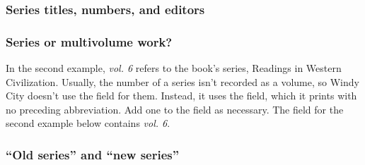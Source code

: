 \documentclass[11pt,letterpaper,oneside]{article}
\begin{document}

\begin{citebib}
\item \cite{barrows1959}
\item \cite*{donne1995}
\newrefcontext[sorting=reverse]
\end{citebib}
\newrefcontext[sorting=nty]

\subsubsection{Series titles, numbers, and editors}
\label{14.123}

\begin{citebib}
\item \cite{lei2014}
\item \cite{mazrim2011}
\item \cite{wauchope1950}
\item \cite{allen2009}
\end{citebib}

\subsubsection{Series or multivolume work?}

In the second example, \textit{vol. 6} refers to the book's series,
Readings in Western Civilization. Usually, the number of a series
isn't recorded as a volume, so Windy City doesn't use the
 field for them. Instead, it uses the
 field, which it prints with no preceding
abbreviation. Add one to the field as necessary. The 
field for the second example below contains \textit{vol. 6}.

\begin{citebib}
\item \cite{boyer1986}
\item \cite{cochrane1987}
\end{citebib}

\setcounter{subsubsection}{125}
\subsubsection{``Old series'' and ``new series''}
\label{14.126}
\end{document}
